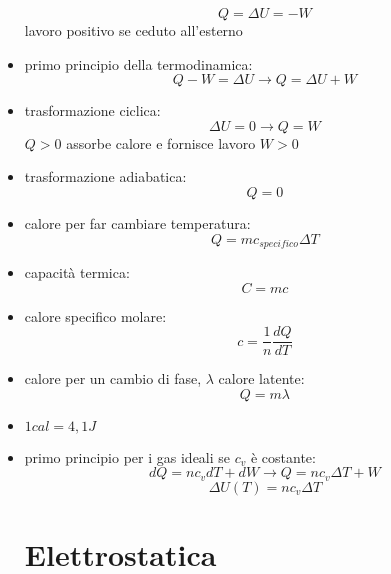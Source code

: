 \documentclass[a4paper,12pt, oneside]{book}
\begin{document}
\begin{itemize}
$$Q=\Delta U=-W$$
lavoro positivo se ceduto all'esterno
\item primo principio della termodinamica:
$$Q-W=\Delta U\to Q=\Delta U+W$$
\item trasformazione ciclica:
$$\Delta U=0\to Q=W$$
$Q>0$ assorbe calore e fornisce lavoro $W>0$
\item trasformazione adiabatica:
$$Q=0$$
\item calore per far cambiare temperatura:
$$Q=mc_{specifico}\Delta T$$
\item capacità termica:
$$C=mc$$
\item calore specifico molare:
$$c=\frac{1}{n}\frac{dQ}{dT}$$
\item calore per un cambio di fase, $\lambda$ calore latente:
$$Q=m\lambda$$
\item $1 cal=4,1J$
\item primo principio per i gas ideali se $c_v$ è costante:
$$dQ=nc_vdT+dW\longrightarrow Q=nc_v\Delta T+W$$
$$\Delta U(T)=nc_v\Delta T$$
\section{Elettrostatica}
\end{itemize}
\end{document}
